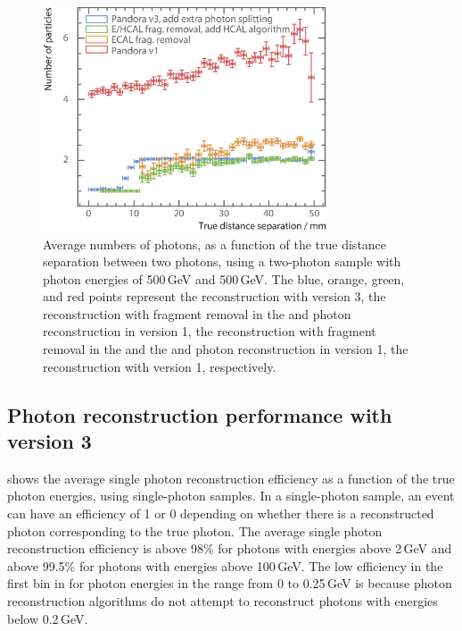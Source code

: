 \begin{figure}[tbph]
\centering
\includegraphics[width=0.75\textwidth]{photon/DoubleCompareAlg5}
\caption[Average number of photons, as a function of the MC distance separation for different algorithms combinations.]
{Average numbers of photons, as a function of the true distance separation between two photons, using a two-photon sample with photon energies of  500\,GeV and 500\,GeV. The blue, orange, green, and red points represent the reconstruction with \pandora version 3, the reconstruction with fragment removal in the \ECAL and photon reconstruction in  \pandora version 1,  the reconstruction with fragment removal in the \ECAL and the \HCAL and photon reconstruction in  \pandora version 1, the reconstruction with \pandora version 1, respectively.}
\label{fig:photonDoubleCompareAlgs}
\end{figure}

\subsection{Photon reconstruction performance with \pandora version 3}


 shows the average single photon reconstruction  efficiency as a function of the true photon energies, using single-photon samples.  In a single-photon sample, an event can have an efficiency of 1 or 0 depending on whether there is a reconstructed photon  corresponding to the true photon. The average single photon reconstruction efficiency is above 98\% for photons with energies above 2\,GeV and above 99.5\% for photons  with energies  above 100\,GeV.  The low efficiency in the first bin in  for photon energies in the range from 0 to 0.25\,GeV is because photon reconstruction algorithms do not attempt to reconstruct photons with energies below 0.2\,GeV.

